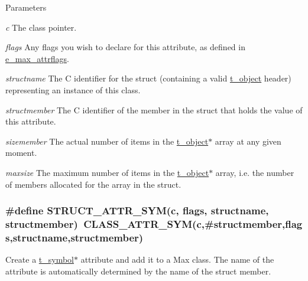 \begin{DoxyParams}{Parameters}
\item[{\em c}]The class pointer. \item[{\em flags}]Any flags you wish to declare for this attribute, as defined in \hyperlink{group__attr_gaf296cfc6741bb19207f6ed8062809115}{e\_\-max\_\-attrflags}. \item[{\em structname}]The C identifier for the struct (containing a valid \hyperlink{structt__object}{t\_\-object} header) representing an instance of this class. \item[{\em structmember}]The C identifier of the member in the struct that holds the value of this attribute. \item[{\em sizemember}]The actual number of items in the \hyperlink{structt__object}{t\_\-object}$\ast$ array at any given moment. \item[{\em maxsize}]The maximum number of items in the \hyperlink{structt__object}{t\_\-object}$\ast$ array, i.e. the number of members allocated for the array in the struct. \end{DoxyParams}
\hypertarget{group__attr_ga34e7280cc9833e6be9c25b545d75dfa5}{
\subsubsection[{STRUCT\_\-ATTR\_\-SYM}]{\setlength{\rightskip}{0pt plus 5cm}\#define STRUCT\_\-ATTR\_\-SYM(c, \/  flags, \/  structname, \/  structmember)~CLASS\_\-ATTR\_\-SYM(c,\#structmember,flags,structname,structmember)}}
\label{group__attr_ga34e7280cc9833e6be9c25b545d75dfa5}


Create a \hyperlink{structt__symbol}{t\_\-symbol}$\ast$ attribute and add it to a Max class. The name of the attribute is automatically determined by the name of the struct member.


